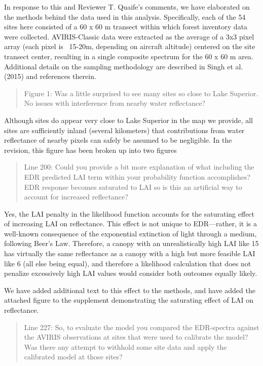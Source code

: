 In response to this and Reviewer T. Quaife’s comments, we have elaborated on the methods behind the data used in this analysis. Specifically, each of the 54 sites here consisted of a 60 x 60 m transect within which forest inventory data were collected. AVIRIS-Classic data were extracted as the average of a 3x3 pixel array (each pixel is ~15-20m, depending on aircraft altitude) centered on the site transect center, resulting in a single composite spectrum for the 60 x 60 m area. Additional details on the sampling methodology are described in Singh et al. (2015) and references therein.

\begin{quote}
  Figure 1: Was a little surprised to see many sites so close to Lake Superior. No issues with interference from nearby water reflectance?
\end{quote}

Although sites do appear very close to Lake Superior in the map we provide, all sites are sufficiently inland (several kilometers) that contributions from water reflectance of nearby pixels can safely be assumed to be negligible. In the revision, this figure has been broken up into two figures

\begin{quote}
  Line 200: Could you provide a bit more explanation of what including the EDR predicted LAI term within your probability function accomplishes? EDR response becomes saturated to LAI so is this an artificial way to account for increased reflectance?
\end{quote}

Yes, the LAI penalty in the likelihood function accounts for the saturating effect of increasing LAI on reflectance. This effect is not unique to EDR---rather, it is a well-known consequence of the exponential extinction of light through a medium, following Beer’s Law. Therefore, a canopy with an unrealistically high LAI like 15 has virtually the same reflectance as a canopy with a high but more feasible LAI like 6 (all else being equal), and therefore a likelihood calculation that does not penalize excessively high LAI values would consider both outcomes equally likely.

We have added additional text to this effect to the methods, and have added the attached figure to the supplement demonstrating the saturating effect of LAI on reflectance.

\begin{quote}
  Line 227: So, to evaluate the model you compared the EDR-spectra against the AVIRIS observations at sites that were used to calibrate the model? Was there any attempt to withhold some site data and apply the calibrated model at those sites?
\end{quote}

